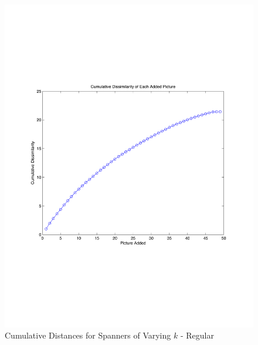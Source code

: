 \begin{figure} 
\begin{centering}
    \includegraphics[scale=0.35]{figures/spannerCumulativeDist.pdf}
    \caption{Cumulative Distances for Spanners of Varying $k$ - Regular}
    \label{fig:spanCumDistReg}
\end{centering}
\end{figure}

